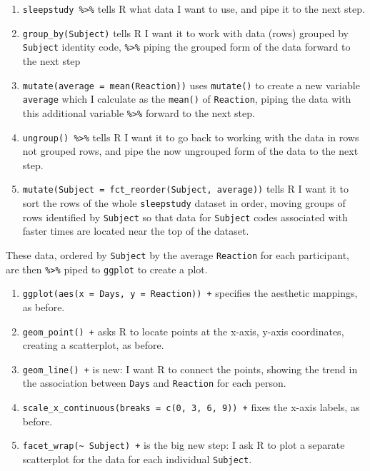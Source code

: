 \documentclass[
  letterpaper,
  DIV=11,
  numbers=noendperiod]{scrreprt}
\providecommand{\tightlist}{%
  \setlength{\itemsep}{0pt}\setlength{\parskip}{0pt}}\usepackage{longtable,booktabs,array}
\begin{document}
\begin{enumerate}
\def\labelenumi{\arabic{enumi}.}
\tightlist
\item
  \texttt{sleepstudy\ \%\textgreater{}\%} tells R what data I want to
  use, and pipe it to the next step.
\item
  \texttt{group\_by(Subject)} tells R I want it to work with data (rows)
  grouped by \texttt{Subject} identity code, \texttt{\%\textgreater{}\%}
  piping the grouped form of the data forward to the next step
\item
  \texttt{mutate(average\ =\ mean(Reaction))} uses \texttt{mutate()} to
  create a new variable \texttt{average} which I calculate as the
  \texttt{mean()} of \texttt{Reaction}, piping the data with this
  additional variable \texttt{\%\textgreater{}\%} forward to the next
  step.
\item
  \texttt{ungroup()\ \%\textgreater{}\%} tells R I want it to go back to
  working with the data in rows not grouped rows, and pipe the now
  ungrouped form of the data to the next step.
\item
  \texttt{mutate(Subject\ =\ fct\_reorder(Subject,\ average))} tells R I
  want it to sort the rows of the whole \texttt{sleepstudy} dataset in
  order, moving groups of rows identified by \texttt{Subject} so that
  data for \texttt{Subject} codes associated with faster times are
  located near the top of the dataset.
\end{enumerate}

These data, ordered by \texttt{Subject} by the average \texttt{Reaction}
for each participant, are then \texttt{\%\textgreater{}\%} piped to
\texttt{ggplot} to create a plot.

\begin{enumerate}
\def\labelenumi{\arabic{enumi}.}
\setcounter{enumi}{5}
\tightlist
\item
  \texttt{ggplot(aes(x\ =\ Days,\ y\ =\ Reaction))\ +} specifies the
  aesthetic mappings, as before.
\item
  \texttt{geom\_point()\ +} asks R to locate points at the x-axis,
  y-axis coordinates, creating a scatterplot, as before.
\item
  \texttt{geom\_line()\ +} is new: I want R to connect the points,
  showing the trend in the association between \texttt{Days} and
  \texttt{Reaction} for each person.
\item
  \texttt{scale\_x\_continuous(breaks\ =\ c(0,\ 3,\ 6,\ 9))\ +} fixes
  the x-axis labels, as before.
\item
  \texttt{facet\_wrap(\textasciitilde{}\ Subject)\ +} is the big new
  step: I ask R to plot a separate scatterplot for the data for each
  individual \texttt{Subject}.
\end{enumerate}
\end{document}
